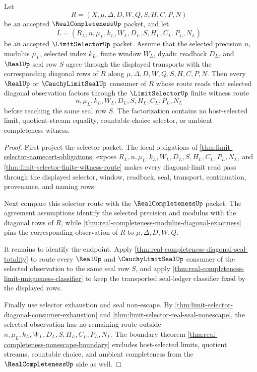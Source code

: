 \begin{theorem}
\label{thm:real-completeness-limitselector-handoff}
Let
$$
R=(X,\mu,\Delta,D,W,Q,S,H,C,P,N)
$$
be an accepted $\RealCompletenessUp$ packet, and let
$$
L=(R_L,n,\mu_L,k_L,W_L,D_L,S,H_L,C_L,P_L,N_L)
$$
be an accepted $\LimitSelectorUp$ packet. Assume that the selected precision $n$, modulus $\mu_L$, selected index $k_L$, finite window $W_L$, dyadic readback $D_L$, and $\RealUp$ seal row $S$ agree through the displayed transports with the corresponding diagonal rows of $R$ along $\mu,\Delta,D,W,Q,S,H,C,P,N$. Then every $\RealUp$ or $\CauchyLimitSealUp$ consumer of $R$ whose route reads that selected diagonal observation factors through the $\LimitSelectorUp$ finite witness route
$$
n,\mu_L,k_L,W_L,D_L,S,H_L,C_L,P_L,N_L
$$
before reaching the same seal row $S$. The factorization contains no host-selected limit, quotient-stream equality, countable-choice selector, or ambient completeness witness.
\end{theorem}
\begin{proof}
First project the selector packet. The local obligations of \autoref{thm:limit-selector-namecert-obligations} expose $R_L,n,\mu_L,k_L,W_L,D_L,S,H_L,C_L,P_L,N_L$, and \autoref{thm:limit-selector-finite-witness-route} makes every diagonal-limit read pass through the displayed selector, window, readback, seal, transport, continuation, provenance, and naming rows.

Next compare this selector route with the $\RealCompletenessUp$ packet. The agreement assumptions identify the selected precision and modulus with the diagonal rows of $R$, while \autoref{thm:real-completeness-modulus-diagonal-exactness} pins the corresponding observation of $R$ to $\mu,\Delta,D,W,Q$.

It remains to identify the endpoint. Apply \autoref{thm:real-completeness-diagonal-seal-totality} to route every $\RealUp$ and $\CauchyLimitSealUp$ consumer of the selected observation to the same seal row $S$, and apply \autoref{thm:real-completeness-limit-uniqueness-classifier} to keep the transported seal-ledger classifier fixed by the displayed rows.

Finally use selector exhaustion and seal non-escape. By \autoref{thm:limit-selector-diagonal-consumer-exhaustion} and \autoref{thm:limit-selector-real-seal-nonescape}, the selected observation has no remaining route outside $n,\mu_L,k_L,W_L,D_L,S,H_L,C_L,P_L,N_L$. The boundary theorem \autoref{thm:real-completeness-nonescape-boundary} excludes host-selected limits, quotient streams, countable choice, and ambient completeness from the $\RealCompletenessUp$ side as well.
\end{proof}

